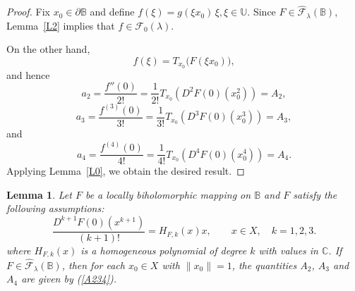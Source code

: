 \documentclass[11pt, reqno]{amsart}
\newtheorem{lem}{Lemma}[section]
\numberwithin{equation}{section}
\begin{document}
 \begin{proof}
Fix $x_{0}\in\partial\mathbb{B}$ and define $f(\xi)=g(\xi x_{0})\,\xi, \xi\in\mathbb{U}.$
Since $F\in\widehat{\mathcal{F}}_{\lambda}(\mathbb{B})$, Lemma~\ref{L2}
implies that $f\in \mathcal{F}_{0}(\lambda).$

On the other hand,
\[
f(\xi)
=
T_{x_{0}}\bigl(F(\xi x_{0})\bigr),
\]
and hence
\[
a_{2}
=
\frac{f''(0)}{2!}
=
\frac{1}{2!}
T_{x_{0}}
\left(
D^{2}F(0)(x_{0}^{2})
\right)
=
A_{2},
\]
\[
a_{3}
=
\frac{f^{(3)}(0)}{3!}
=
\frac{1}{3!}
T_{x_{0}}
\left(
D^{3}F(0)(x_{0}^{3})
\right)
=
A_{3},
\]
and \[
a_{4}
=
\frac{f^{(4)}(0)}{4!}
=
\frac{1}{4!}
T_{x_{0}}
\left(
D^{4}F(0)(x_{0}^{4})
\right)
=
A_{4}.
\]
Applying Lemma~\ref{L0}, we obtain the desired result.
\end{proof}
\begin{lem}\label{L4} Let $F$ be a locally biholomorphic mapping on $\mathbb{B}$ and $F$ satisfy the following assumptions:
\begin{equation}\label{cc1}
\frac{D^{k+1}F(0)\left(x^{k+1}\right)}{(k+1)!}
= H_{F,k}(x)x,\qquad x\in X,\quad k=1,2,3.
\end{equation}
where $H_{F,k}(x)$ is a homogeneous polynomial of degree $k$ with values in $\mathbb{C}$. If $F\in \widehat{\mathcal{F}}_{\lambda}(\mathbb{B})$, then for each $x_0\in X$ with $\|x_0\|=1$,  the quantities $A_2$, $A_3$ and $A_4$ are given by  (\ref{A234}).
\end{lem}
\end{document}
